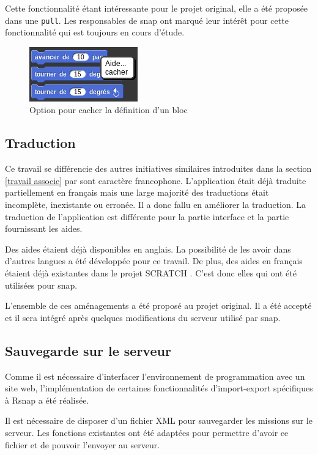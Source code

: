 Cette fonctionnalité étant intéressante pour le projet original, elle a été proposée dans une \texttt{\gls{pull}}. Les responsables de \gls{snap} ont marqué leur intérêt pour cette fonctionnalité qui est toujours en cours d'étude.
\begin{figure}
  \begin{center}
    \includegraphics[scale=0.5]{content/7-solution/2-snap/images/cacher}
    \caption{Option pour cacher la définition d'un bloc}
    \label{fig:cacher}
  \end{center}
\end{figure}

\subsection{Traduction}
Ce travail se différencie des autres initiatives similaires introduites dans la section \ref{travail associe} par sont caractère francophone. L'application était déjà traduite partiellement en français mais une large majorité des traductions était incomplète, inexistante ou erronée. Il a donc fallu en améliorer la traduction. La traduction de l'application est différente pour la partie interface et la partie fournissant les aides.

Des aides étaient déjà disponibles en anglais. La possibilité de les avoir dans d'autres langues a été développée pour ce travail. De plus, des aides en français étaient déjà existantes dans le projet SCRATCH \cite{scratch-translation}. C'est donc elles qui ont été utilisées pour \gls{snap}.

L'ensemble de ces aménagements a été proposé au projet original. Il a été accepté et il sera intégré après quelques modifications du serveur utilisé par \gls{snap}.

\subsection{Sauvegarde sur le serveur}
Comme il est nécessaire d'interfacer l'environnement de programmation avec un site web, l'implémentation de certaines fonctionnalités d'import-export spécifiques à \gls{Rsnap} a été réalisée.

Il est nécessaire de disposer d'un fichier XML pour sauvegarder les missions sur le serveur. Les fonctions existantes ont été adaptées pour permettre d'avoir ce fichier et de pouvoir l'envoyer au serveur.

